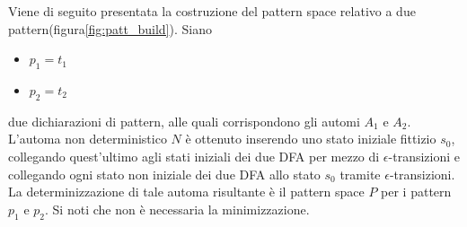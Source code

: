 \begin{ex}
Viene di seguito presentata la costruzione del pattern space relativo a due pattern(figura\ref{fig:patt_build}).
Siano
\begin{itemize}
\item $p_1 = t_1$
\item $p_2 = t_2$
\end{itemize}
due dichiarazioni di pattern, alle quali corrispondono gli automi $A_1$ e $A_2$. L'automa non deterministico $N$ è ottenuto inserendo uno stato iniziale fittizio $s_0$, collegando quest'ultimo agli stati iniziali dei due DFA per mezzo di $\epsilon$-transizioni e collegando ogni stato non iniziale dei due DFA allo stato $s_0$ tramite $\epsilon$-transizioni. La determinizzazione di tale automa risultante è il pattern space $P$ per i pattern $p_1$ e $p_2$. Si noti che non è necessaria la minimizzazione.
\end{ex}

